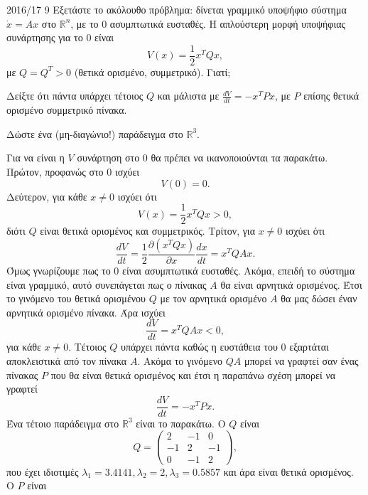 \begin{exercise}{2016/17 9}
    Εξετάστε το ακόλουθο πρόβλημα: δίνεται γραμμικό υποψήφιο σύστημα
    \( \dot{x} = Ax \) στο \( \mathbb{R}^n \), με το \( 0 \) ασυμπτωτικά
    ευσταθές. Η απλούστερη μορφή υποψήφιας συνάρτησης  για το \( 0
    \) είναι
    \[
        V(x) = \frac{1}{2}x^{T}Qx,
    \]
    με \( Q = Q^T > 0 \) (θετικά ορισμένο, συμμετρικό). Γιατί;

    Δείξτε ότι πάντα υπάρχει τέτοιος \( Q \) και μάλιστα με \( \frac{dV}{dt} =
    -x^{T}Px \), με \( P \) επίσης θετικά ορισμένο συμμετρικό πίνακα.

    Δώστε ένα (μη-διαγώνιο!) παράδειγμα στο \( \mathbb{R}^3 \).
\end{exercise}
\begin{solution}
    Για να είναι η \( V \) συνάρτηση  στο \( 0 \) θα πρέπει να
    ικανοποιούνται τα παρακάτω. Πρώτον, προφανώς στο \( 0 \) ισχύει
    \[
        V(0) = 0.
    \]
    Δεύτερον, για κάθε \( x \neq 0 \) ισχύει ότι
    \[
        V(x) = \frac{1}{2}x^{T}Qx > 0,
    \]
    διότι \( Q \) είναι θετικά ορισμένος και συμμετρικός. Τρίτον, για \( x \neq
    0 \) ισχύει ότι
    \[
        \frac{dV}{dt} = \frac{1}{2}
        \frac{\partial \left( x^{T}Qx \right)}{\partial x}
        \frac{dx}{dt} =
        x^{T}QAx.
    \]
    Όμως γνωρίζουμε πως το \( 0 \) είναι ασυμπτωτικά ευσταθές. Ακόμα, επειδή το
    σύστημα είναι γραμμικό, αυτό συνεπάγεται πως ο πίνακας \( A \) θα είναι
    αρνητικά ορισμένος. Έτσι το γινόμενο του θετικά ορισμένου \( Q \) με τον
    αρνητικά ορισμένο \( A \) θα μας δώσει έναν αρνητικά ορισμένο πίνακα.
    Άρα ισχύει
    \[
        \frac{dV}{dt} = x^{T}QAx < 0,
    \]
    για κάθε \( x \neq 0 \). Τέτοιος \( Q \) υπάρχει πάντα καθώς η ευστάθεια του
    \( 0 \) εξαρτάται αποκλειστικά από τον πίνακα \( A \). Ακόμα το γινόμενο
    \( QA \) μπορεί να γραφτεί σαν ένας πίνακας \( P \) που θα είναι θετικά
    ορισμένος και έτσι η παραπάνω σχέση μπορεί να γραφτεί
    \[
        \frac{dV}{dt} = -x^{T}Px.
    \]
    Ένα τέτοιο παράδειγμα στο \( \mathbb{R}^3 \) είναι το παρακάτω. Ο \( Q \)
    είναι
    \[
        Q =
        \begin{pmatrix}
            2 & -1 & 0 \\
            -1 & 2 & -1 \\
            0 & -1 & 2
        \end{pmatrix},
    \]
    που έχει ιδιοτιμές \( \lambda_1 = 3.4141, \lambda_2 = 2, \lambda_3 = 0.5857
    \) και άρα είναι θετικά ορισμένος. Ο \( P \) είναι
    \[
\]
\end{solution}
